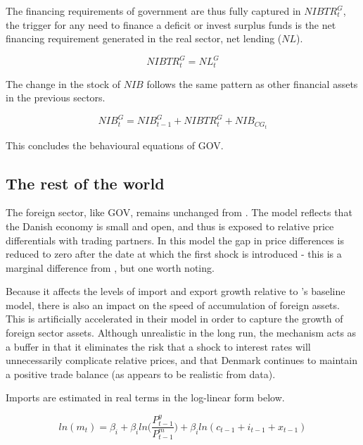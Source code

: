 \documentclass[
]{book}
\begin{document}
The financing requirements of government are thus fully captured in \(NIBTR^G_t\),
the trigger for any need to finance a deficit or invest surplus funds is the
net financing requirement generated in the real sector, net lending (\(NL\)).

\begin{equation}
NIBTR^G_t = NL^G_t
\end{equation}

The change in the stock of \(NIB\) follows the same pattern as other financial assets
in the previous sectors.

\begin{equation}
NIB^G_t = NIB^G_{t-1} + NIBTR^G_t + NIB_{CG_t}
\end{equation}

This concludes the behavioural equations of GOV.

\hypertarget{sec:fi-fl-sfc-model-eq-row}{%
\subsection{The rest of the world}\label{sec:fi-fl-sfc-model-eq-row}}

The foreign sector, like GOV, remains unchanged from \citet{byrialsenraza2019empirical}.
The model reflects that the Danish economy is small and open, and thus is exposed to
relative price differentials with trading partners. In this model the gap in price
differences is reduced to zero after the date at which the first shock is introduced -
this is a marginal difference from \citet{byrialsenraza2019empirical}, but one worth noting.

Because it affects the levels of import and export growth relative to \citet{byrialsenraza2019empirical}'s
baseline model, there is also an impact on the speed of accumulation of foreign assets.
This is artificially accelerated in their model in order to capture the growth of
foreign sector assets. Although unrealistic in the long run, the mechanism
acts as a buffer in that it eliminates the risk that a shock to interest rates
will unnecessarily complicate relative prices, and that Denmark continues to
maintain a positive trade balance (as appears to be realistic from data).

Imports are estimated in real terms in the log-linear form below.

\begin{equation}
ln(m_t) = \beta _i + \beta _iln \Bigg( \frac{P^y_{t-1}}{P^m_{t-1}} \Bigg) + \beta _iln(c_{t-1} + i_{t-1} + x_{t-1})
\end{equation}
\end{document}
